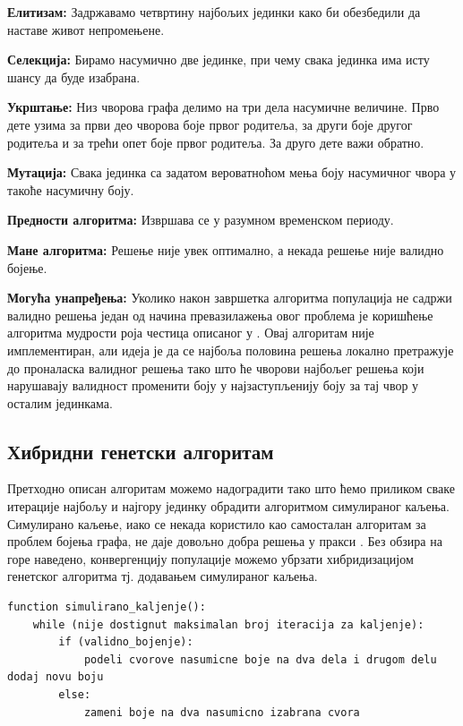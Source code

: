 \documentclass[a4paper]{article}
\begin{document}
{\textbf{Елитизам:} Задржавамо четвртину најбољих јединки како би обезбедили да наставе живот непромењене.

\textbf{Селекција:} Бирамо насумично две јединке, при чему свака јединка има исту шансу да буде изабрана.

\textbf{Укрштање:} Низ чворова графа делимо на три дела насумичне величине. Прво дете узима за први део чворова боје првог родитеља, за други боје другог родитеља и за трећи опет боје првог родитеља. За друго дете важи обратно.

\textbf{Мутација:} Свака јединка са задатом вероватноћом мења боју насумичног чвора у такоће насумичну боју.

\textbf{Предности алгоритма:} Извршава се у разумном временском периоду.

\textbf{Мане алгоритма:} Решење није увек оптимално, а некада решење није валидно бојење.

\textbf{Могућа унапређења:} Уколико након завршетка алгоритма популација не садржи валидно решења један од начина превазилажења овог проблема је коришћење алгоритма мудрости роја честица описаног у \cite{wisdom}. Овај алгоритам није имплементиран, али идеја је да се најбоља половина решења локално претражује до проналаска валидног решења тако што ће чворови најбољег решења који нарушавају валидност променити боју у најзаступљенију боју за тај чвор у осталим јединкама.

\subsection{Хибридни генетски алгоритам}
Претходно описан алгоритам можемо надоградити тако што ћемо приликом сваке итерације најбољу и најгору јединку обрадити алгоритмом симулираног каљења. Симулирано каљење, иако се некада користило као самосталан алгоритам за проблем бојења графа, не даје довољно добра решења у пракси \cite{annealing}. Без обзира на горе наведено, конвергенцију популације можемо убрзати хибридизацијом генетског алгоритма тј. додавањем симулираног каљења.\\

\begin{lstlisting}[caption={Псеудо-код симулираног каљења},frame=single]
function simulirano_kaljenje():
	while (nije dostignut maksimalan broj iteracija za kaljenje):
		if (validno_bojenje):
			podeli cvorove nasumicne boje na dva dela i drugom delu dodaj novu boju
		else:
			zameni boje na dva nasumicno izabrana cvora
		

\end{lstlisting}}
\end{document}
